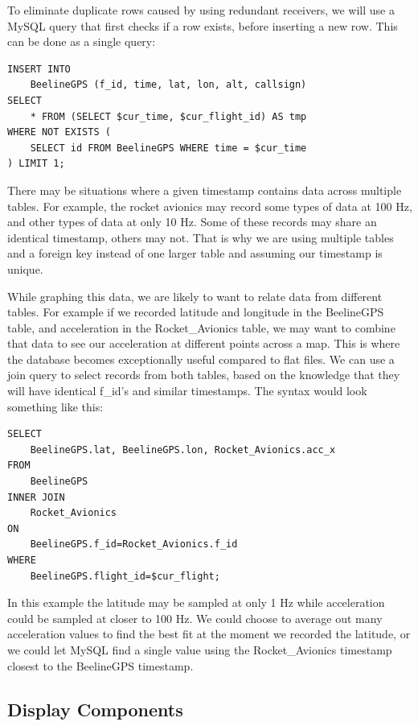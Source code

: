 \documentclass[onecolumn, draftclsnofoot, 10pt, compsoc]{IEEEtran}
\begin{document}
To eliminate duplicate rows caused by using redundant receivers, we will use a MySQL query that first checks if a row exists, before inserting a new row.  This can be done as a single query: \cite{unique-sql-insert}

\begin{lstlisting}[frame=single]
INSERT INTO
	BeelineGPS (f_id, time, lat, lon, alt, callsign)
SELECT
	* FROM (SELECT $cur_time, $cur_flight_id) AS tmp
WHERE NOT EXISTS (
    SELECT id FROM BeelineGPS WHERE time = $cur_time
) LIMIT 1;
\end{lstlisting}

There may be situations where a given timestamp contains data across multiple tables.  For example, the rocket avionics may record some types of data at 100 Hz, and other types of data at only 10 Hz.  Some of these records may share an identical timestamp, others may not.  That is why we are using multiple tables and a foreign key instead of one larger table and assuming our timestamp is unique.

While graphing this data, we are likely to want to relate data from different tables.  For example if we recorded latitude and longitude in the BeelineGPS table, and acceleration in the Rocket\_Avionics table, we may want to combine that data to see our acceleration at different points across a map.  This is where the database becomes exceptionally useful compared to flat files.  We can use a join query to select records from both tables, based on the knowledge that they will have identical f\_id's and similar timestamps.  The syntax would look something like this:

\begin{lstlisting}[frame=single]
SELECT
	BeelineGPS.lat, BeelineGPS.lon, Rocket_Avionics.acc_x
FROM
	BeelineGPS
INNER JOIN
	Rocket_Avionics
ON
	BeelineGPS.f_id=Rocket_Avionics.f_id
WHERE
	BeelineGPS.flight_id=$cur_flight;
\end{lstlisting}

In this example the latitude may be sampled at only 1 Hz while acceleration could be sampled at closer to 100 Hz.  We could choose to average out many acceleration values to find the best fit at the moment we recorded the latitude, or we could let MySQL find a single value using the Rocket\_Avionics timestamp closest to the BeelineGPS timestamp.

\subsection{Display Components}
\end{document}
